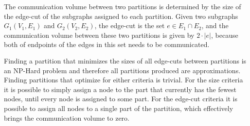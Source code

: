 The communication volume between two partitions is determined by the size of the edge-cut of the subgraphs assigned to each partition. Given two subgraphs \(G_{1}(V_{1},E_{1})\) and \(G_{2}(V_{2},E_{2})\), the edge-cut is the set \(e \in E_{1} \cap E_{2}\), and the communication volume between these two partitions is given by \(2 \cdot  \left| e \right|\), because both of endpoints of the edges in this set needs to be communicated.
\medskip

Finding a partition that minimizes the sizes of all edge-cuts between partitions is an NP-Hard problem and therefore all partitions produced are approximations. Finding partitions that optimize for either criteria is trivial. For the size criteria it is possible to simply assign a node to the part that currently has the fewest nodes, until every node is assigned to some part. For the edge-cut criteria it is possible to assign all nodes to a single part of the partition, which effectively brings the communication volume to zero.




